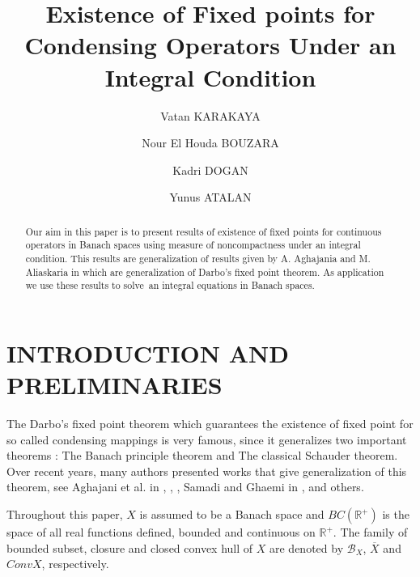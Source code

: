 \documentclass{amsart}
\theoremstyle{plain}
\numberwithin{equation}{section}
\begin{document}
\title[Existence of fixed points]{Existence of Fixed points for Condensing
Operators Under an Integral Condition}
\author{Vatan KARAKAYA}
\address{Department of Mathematical Engineering, Faculty of
Chemistry-Metallurgical, Yildiz Technical University, Istanbul, Turkey }
\author{Nour El Houda BOUZARA}
\address{Department of Mathematics, Faculty of Science and Letters, Yildiz
Technical University, Istanbul, Turkey }
\author{Kadri DOGAN}
\address{Department of Mathematical Engineering, Faculty of
Chemistry-Metallurgical, Yildiz Technical University, Istanbul, Turkey }
\author{Yunus ATALAN}
\address{Department of Mathematics, Faculty of Science and Letters, Yildiz
Technical University, Istanbul, Turkey }

\begin{abstract}
Our aim in this paper is to present results of existence of fixed points for
continuous operators in Banach spaces using measure of noncompactness under
an integral condition. This results are generalization of results given by
A. Aghajania and M. Aliaskaria in \cite{agha} which are generalization of
Darbo's fixed point theorem. As application we use these results to solve\
an integral equations in Banach spaces.
\end{abstract}

\maketitle

\section{INTRODUCTION AND PRELIMINARIES}

The Darbo's fixed point theorem which guarantees the existence of fixed
point for so called condensing mappings is very famous, since it generalizes
two important theorems : The Banach principle theorem and The classical
Schauder theorem. Over recent years, many authors presented works that give
generalization of this theorem, see Aghajani et al. in \cite{aghabanas}, 
\cite{agha}, \cite{mursaleen}, Samadi and Ghaemi in \cite{Samadi}, \cite{samadi} and others.

Throughout this paper, $X$ is assumed to be a Banach space and $BC\left( 
\mathbb{R}^{+}\right) $ is the space of all real functions defined, bounded
and continuous on $\mathbb{R}^{+}$. The family of bounded subset, closure
and closed convex hull of $X$ are denoted by $\mathcal{B}_{X}$, $\overline{X}
$ and $ConvX$, respectively.
\end{document}
